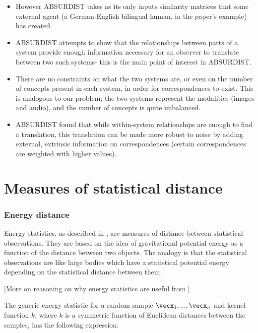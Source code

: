 \begin{itemize}
\begin{itemize}
            \item However ABSURDIST takes as its only inputs similarity matrices that some external agent (a German-English bilingual human, in the paper's example) has created. 
            \item ABSURDIST attempts to show that the relationships between parts of a system provide enough information necessary for an observer to translate between two such systems- this is the main point of interest in ABSURDIST. 
            \item There are no constraints on what the two systems are, or even on the number of concepts present in each system, in order for correspondences to exist. This is analogous to our problem; the two systems represent the modalities (images and audio), and the number of concepts  is quite unbalanced. 
            \item ABSURDIST found that while within-system relationships are enough to find a translation, this translation can be made more robust to noise by adding external, extrinsic information on correspondences (certain correspondences are weighted with higher values). 
        \end{itemize}
    \end{itemize}
    
\section{Measures of statistical distance}

\subsubsection{Energy distance}

Energy statistics, as described in \cite{energystatistics}, are measures of distance between statistical observations. They are based on the idea of gravitational potential energy as a function of the distance between two objects. The analogy is that the statistical observations are like large bodies which have a statistical potential energy depending on the statistical distance between them. 

[More on reasoning on why energy statistics are useful from \cite{energystatistics}]

The generic energy statistic for a random sample $\vecx_1, ..., \vecx_n$ and kernel function $k$, where $k$ is a symmetric function of Euclidean distances between the samples, has the following expression:


